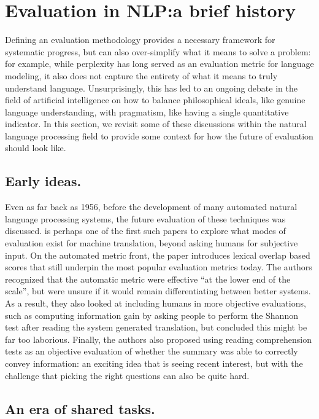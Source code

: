 \section{\label{sec:setup:history}Evaluation in NLP:\@ a brief history}

Defining an evaluation methodology provides a necessary framework for systematic progress, but can also over-simplify what it means to solve a problem: for example, while perplexity has long served as an evaluation metric for language modeling, it also does not capture the entirety of what it means to truly understand language.
Unsurprisingly, this has led to an ongoing debate in the field of artificial intelligence on how to balance philosophical ideals, like genuine language understanding, with pragmatism, like having a single quantitative indicator.
In this section, we revisit some of these discussions within the natural language processing field to provide some context for how the future of evaluation should look like.

\subsection{Early ideas.}

Even as far back as 1956, before the development of many automated natural language processing systems, the future evaluation of these techniques was discussed.
\citet{miller1956psychological} is perhaps one of the first such papers to explore what modes of evaluation exist for machine translation, beyond asking humans for subjective input.
On the automated metric front, the paper introduces lexical overlap based scores that still underpin the most popular evaluation metrics today.
The authors recognized that the automatic metric were effective ``at the lower end of the scale'', but were unsure if it would remain differentiating between better systems.
As a result, they also looked at including humans in more objective evaluations, such as computing information gain by asking people to perform the Shannon test after reading the system generated translation, but concluded this might be far too laborious.
Finally, the authors also proposed using reading comprehension tests as an objective evaluation of whether the summary was able to correctly convey information: an exciting idea that is seeing recent interest, but with the challenge that picking the right questions can also be quite hard.

\subsection{An era of shared tasks.}

